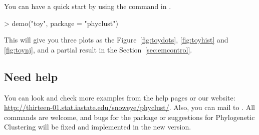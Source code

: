 You can have a quick start by using the  command
in .
\begin{Code}
> demo("toy", package = "phyclust")
\end{Code}
This will give you three plots as the Figure~\ref{fig:toydots},
\ref{fig:toyhist} and \ref{fig:toynj}, and a partial result in
the Section~\ref{sec:emcontrol}.




\subsection[Need help]{Need help}
\label{sec:needhelp}

You can look and check more examples from the help pages or our
website:
\url{http://thirteen-01.stat.iastate.edu/snoweye/phyclust/}.
Also, you can mail to .
All commands are welcome, and bugs for the
 package or suggestions for Phylogenetic Clustering
will be fixed and implemented in the new version.

